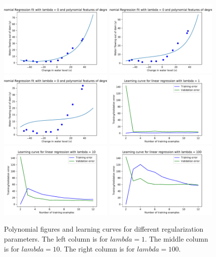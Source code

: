 \documentclass[]{book}
\theoremstyle{definition}
\begin{document}
\begin{figure}[H]
	\includegraphics[width=5.5cm]{fig9_1.pdf}
	\includegraphics[width=5.5cm]{fig9_10.pdf}
	\includegraphics[width=5.5cm]{fig9_100.pdf}
	\includegraphics[width=5.5cm]{fig10_1.pdf}
	\includegraphics[width=5.5cm]{fig10_10.pdf}
	\includegraphics[width=5.5cm]{fig10_100.pdf}
	\caption{Polynomial figures and learning curves for different regularization parameters. The left column is for $lambda = 1$. The middle column is for $lambda = 10$. The right column is for $lambda = 100$.}
	\label{fig:11}
\end{figure}
\end{document}
